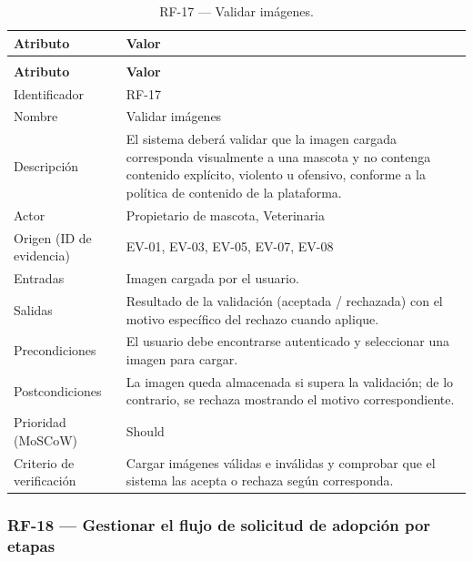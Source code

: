 \documentclass[journal,onecolumn]{IEEEtran}
\makeatletter
\newenvironment{atributos}[2]{%
	\small
	\begin{longtable}{@{}>{\raggedright\arraybackslash}p{4.2cm} >{\raggedright\arraybackslash}p{11.2cm}@{}}
		\caption{#2}\label{tab:#1}\\
		\toprule
		\textbf{Atributo} & \textbf{Valor} \\
		\midrule
		\endfirsthead
		\multicolumn{2}{@{}l}{\small\itshape (continuación)}\\
		\toprule
		\textbf{Atributo} & \textbf{Valor} \\
		\midrule
		\endhead
		\bottomrule
		\endlastfoot
	}{%
	\end{longtable}
	\normalsize
}
\makeatother
\begin{document}
	\begin{atributos}{RF-17}{RF-17 --- Validar imágenes.}
		Identificador & RF-17 \\
		Nombre & Validar imágenes \\
		Descripción & El sistema deberá validar que la imagen cargada corresponda visualmente a una mascota y no contenga contenido explícito, violento u ofensivo, conforme a la política de contenido de la plataforma. \\
		Actor & Propietario de mascota, Veterinaria \\
		Origen (ID de evidencia) & EV-01, EV-03, EV-05, EV-07, EV-08 \\
		Entradas & Imagen cargada por el usuario. \\
		Salidas & Resultado de la validación (aceptada / rechazada) con el motivo específico del rechazo cuando aplique. \\
		Precondiciones & El usuario debe encontrarse autenticado y seleccionar una imagen para cargar. \\
		Postcondiciones & La imagen queda almacenada si supera la validación; de lo contrario, se rechaza mostrando el motivo correspondiente. \\
		Prioridad (MoSCoW) & Should \\
		Criterio de verificación & Cargar imágenes válidas e inválidas y comprobar que el sistema las acepta o rechaza según corresponda. \\
	\end{atributos}
	
	\subsubsection{RF-18 --- Gestionar el flujo de solicitud de adopción por etapas}
	
\end{document}

